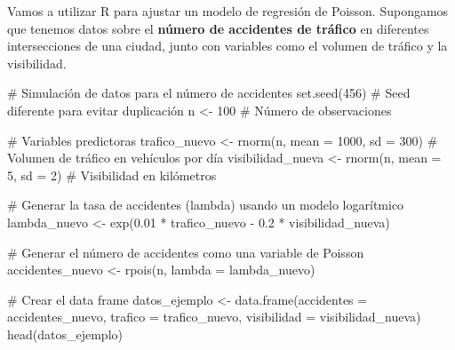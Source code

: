 \documentclass[
  letterpaper,
  DIV=11,
  numbers=noendperiod]{scrreprt}
\newenvironment{Shaded}{\begin{snugshade}}{\end{snugshade}}
\newcommand{\AttributeTok}[1]{\textcolor[rgb]{0.40,0.45,0.13}{#1}}
\newcommand{\CommentTok}[1]{\textcolor[rgb]{0.37,0.37,0.37}{#1}}
\newcommand{\DecValTok}[1]{\textcolor[rgb]{0.68,0.00,0.00}{#1}}
\newcommand{\FloatTok}[1]{\textcolor[rgb]{0.68,0.00,0.00}{#1}}
\newcommand{\FunctionTok}[1]{\textcolor[rgb]{0.28,0.35,0.67}{#1}}
\newcommand{\NormalTok}[1]{\textcolor[rgb]{0.00,0.23,0.31}{#1}}
\newcommand{\OtherTok}[1]{\textcolor[rgb]{0.00,0.23,0.31}{#1}}
\newcommand{\SpecialCharTok}[1]{\textcolor[rgb]{0.37,0.37,0.37}{#1}}
\begin{document}
\begin{tcolorbox}[enhanced jigsaw, breakable, toprule=.15mm, bottomtitle=1mm, coltitle=black, colbacktitle=quarto-callout-tip-color!10!white, titlerule=0mm, opacitybacktitle=0.6, bottomrule=.15mm, toptitle=1mm, title=\textcolor{quarto-callout-tip-color}{\faLightbulb}\hspace{0.5em}{Ejemplo}, arc=.35mm, rightrule=.15mm, opacityback=0, colframe=quarto-callout-tip-color-frame, leftrule=.75mm, left=2mm, colback=white]

Vamos a utilizar R para ajustar un modelo de regresión de Poisson.
Supongamos que tenemos datos sobre el \textbf{número de accidentes de
tráfico} en diferentes intersecciones de una ciudad, junto con variables
como el volumen de tráfico y la visibilidad.

\begin{Shaded}
\begin{Highlighting}[]
\CommentTok{\# Simulación de datos para el número de accidentes}
\FunctionTok{set.seed}\NormalTok{(}\DecValTok{456}\NormalTok{)  }\CommentTok{\# Seed diferente para evitar duplicación}
\NormalTok{n }\OtherTok{\textless{}{-}} \DecValTok{100}  \CommentTok{\# Número de observaciones}

\CommentTok{\# Variables predictoras}
\NormalTok{trafico\_nuevo }\OtherTok{\textless{}{-}} \FunctionTok{rnorm}\NormalTok{(n, }\AttributeTok{mean =} \DecValTok{1000}\NormalTok{, }\AttributeTok{sd =} \DecValTok{300}\NormalTok{)  }\CommentTok{\# Volumen de tráfico en vehículos por día}
\NormalTok{visibilidad\_nueva }\OtherTok{\textless{}{-}} \FunctionTok{rnorm}\NormalTok{(n, }\AttributeTok{mean =} \DecValTok{5}\NormalTok{, }\AttributeTok{sd =} \DecValTok{2}\NormalTok{)   }\CommentTok{\# Visibilidad en kilómetros}

\CommentTok{\# Generar la tasa de accidentes (lambda) usando un modelo logarítmico}
\NormalTok{lambda\_nuevo }\OtherTok{\textless{}{-}} \FunctionTok{exp}\NormalTok{(}\FloatTok{0.01} \SpecialCharTok{*}\NormalTok{ trafico\_nuevo }\SpecialCharTok{{-}} \FloatTok{0.2} \SpecialCharTok{*}\NormalTok{ visibilidad\_nueva)}

\CommentTok{\# Generar el número de accidentes como una variable de Poisson}
\NormalTok{accidentes\_nuevo }\OtherTok{\textless{}{-}} \FunctionTok{rpois}\NormalTok{(n, }\AttributeTok{lambda =}\NormalTok{ lambda\_nuevo)}

\CommentTok{\# Crear el data frame}
\NormalTok{datos\_ejemplo }\OtherTok{\textless{}{-}} \FunctionTok{data.frame}\NormalTok{(}\AttributeTok{accidentes =}\NormalTok{ accidentes\_nuevo, }\AttributeTok{trafico =}\NormalTok{ trafico\_nuevo, }\AttributeTok{visibilidad =}\NormalTok{ visibilidad\_nueva)}
\FunctionTok{head}\NormalTok{(datos\_ejemplo)}
\end{Highlighting}
\end{Shaded}


\end{tcolorbox}
\end{document}
